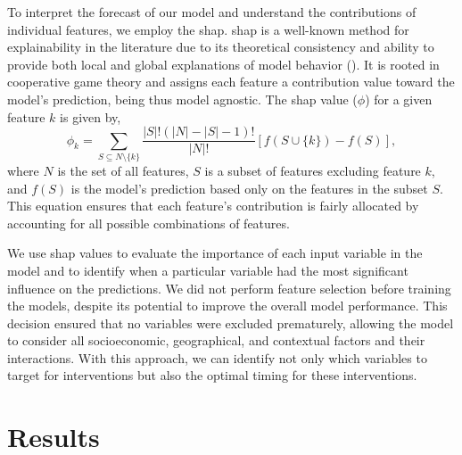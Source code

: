 \documentclass[preprint,authoryear,12pt]{elsarticle}
\newcommand{\citeTwo}[1]{(\cite{#1})}
\begin{document}
To interpret the forecast of our model and understand the contributions of individual features, we employ the \Gls{shap}. \Gls{shap} is a well-known method for explainability in the literature due to its theoretical consistency and ability to provide both local and global explanations of model behavior \citeTwo{LL17}. It is rooted in cooperative game theory and assigns each feature a contribution value toward the model’s prediction, being thus model agnostic. The \Gls{shap} value ($\phi$) for a given feature $k$ is given by,
\begin{equation}
\phi_k = \sum_{S \subseteq N \setminus \{k\}} \frac{|S|!(|N| - |S| - 1)!}{|N|!} \left[ f(S \cup \{k\}) - f(S) \right],
\end{equation}
where $N$ is the set of all features, $S$ is a subset of features excluding feature $k$, and $f(S)$ is the model’s prediction based only on the features in the subset $S$. This equation ensures that each feature's contribution is fairly allocated by accounting for all possible combinations of features.

We use \Gls{shap} values to evaluate the importance of each input variable in the model and to identify when a particular variable had the most significant influence on the predictions. We did not perform feature selection before training the models, despite its potential to improve the overall model performance. This decision ensured that no variables were excluded prematurely, allowing the model to consider all socioeconomic, geographical, and contextual factors and their interactions. With this approach, we can identify not only which variables to target for interventions but also the optimal timing for these interventions. 

\section{Results} \label{Results}

\end{document}
